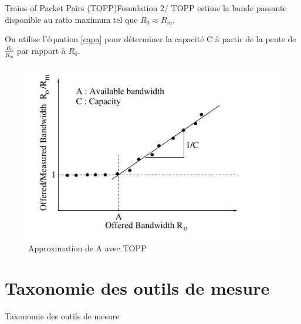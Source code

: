 \documentclass[compress]{beamer}
\begin{document}
\begin{frame}{Trains of Packet Pairs (TOPP)}{Fomulation 2/}
TOPP estime la bande passante disponible au ratio maximum tel que 
$R_0 \approx R_m$.

On utilise l'équation \eqref{capa} pour déterminer la capacité C à partir 
de la pente de $\frac{R_0}{R_m}$ par rapport à $R_0$.
\begin{figure}[hbtp]
		\centering
		\includegraphics[scale=0.4]{TOPP.png}
		\caption{Approximation de A avec TOPP}
	\end{figure}
\end{frame}

\section{Taxonomie des outils de mesure}
\begin{frame}{Taxonomie des outils de mesure}

\end{frame}
\end{document}
